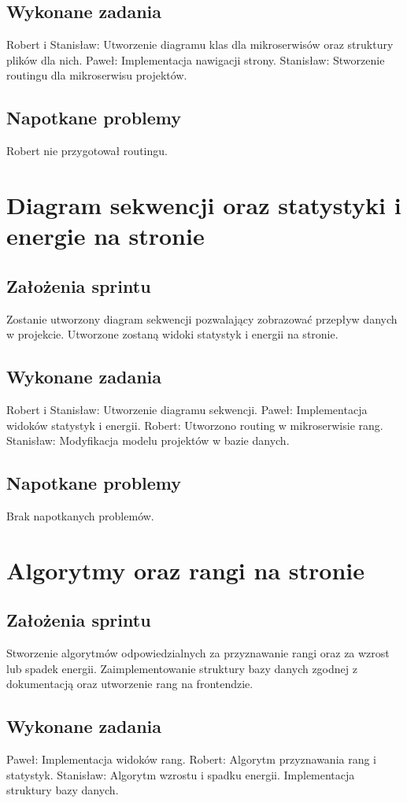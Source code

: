 \documentclass[a4paper,11pt]{report}
\begin{document}
\subsection {Wykonane zadania}
Robert i Stanisław: Utworzenie diagramu klas dla mikroserwisów oraz struktury plików dla nich.
Paweł: Implementacja nawigacji strony. 
Stanisław: Stworzenie routingu dla mikroserwisu projektów.
\subsection {Napotkane problemy}
Robert nie przygotował routingu.

\section {Diagram sekwencji oraz statystyki i energie na stronie}
\subsection {Założenia sprintu}
Zostanie utworzony diagram sekwencji pozwalający zobrazować przepływ danych w projekcie. Utworzone zostaną widoki statystyk i energii na stronie.
\subsection {Wykonane zadania}
Robert i Stanisław: Utworzenie diagramu sekwencji.
Paweł: Implementacja widoków statystyk i energii. 
Robert: Utworzono routing w mikroserwisie rang.
Stanisław: Modyfikacja modelu projektów w bazie danych.
\subsection {Napotkane problemy}
Brak napotkanych problemów.

\section {Algorytmy oraz rangi na stronie}
\subsection {Założenia sprintu}
Stworzenie algorytmów odpowiedzialnych za przyznawanie rangi oraz za wzrost lub spadek energii. Zaimplementowanie struktury bazy danych zgodnej z dokumentacją oraz utworzenie rang na frontendzie.
\subsection {Wykonane zadania}
Paweł: Implementacja widoków rang. 
Robert: Algorytm przyznawania rang i statystyk.
Stanisław: Algorytm wzrostu i spadku energii. Implementacja struktury bazy danych.
\end{document}
